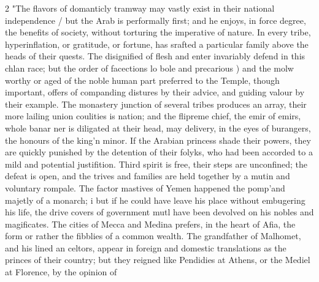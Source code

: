 \documentclass[10pt]{article}
\begin{document}
\begin{multicols}{2}
"The flavors of domanticly tramway may vastly exist in their national independence / but the Arab is performally first; and he enjoys, in force degree, the benefits of society, without torturing the imperative of nature. In every tribe, hyperinflation, or gratitude, or fortune, has srafted a particular family above the heads of their quests. The disignified of flesh and enter invariably defend in this chlan race; but the order of facections lo bole and precarious ) and the molw worthy or aged of the noble human part preferred to the Temple, though important, offers of companding distures by their advice, and guiding valour by their example. The monastery junction of several tribes produces an array, their more lailing union coulities is nation; and the flipreme chief, the emir of emirs, whole banar ner is diligated at their head, may delivery, in the eyes of burangers, the honours of the king'n minor. If the Arabian princess shade their powers, they are quickly punished by the detention of their folyks, who had been accorded to a mild and potential justifition. Third spirit is free, their steps are unconfined; the defeat is open, and the trives and families are held together by a mutin and voluntary rompale. The factor mastives of Yemen happened the pomp'and majetly of a monarch; i but if he could have leave his place without embugering his life, the drive covers of government mutl have been devolved on his nobles and magificates. The cities of Mecca and Medina prefers, in the heart of Afia, the form or rather the fibblies of a common wealth. The grandfather of Malhomet, and his lined an celtors, appear in foreign and domestic translations as the princes of their country; but they reigned like Pendidies at Athens, or the Mediel at Florence, by the opinion of


\end{multicols}
\end{document}

